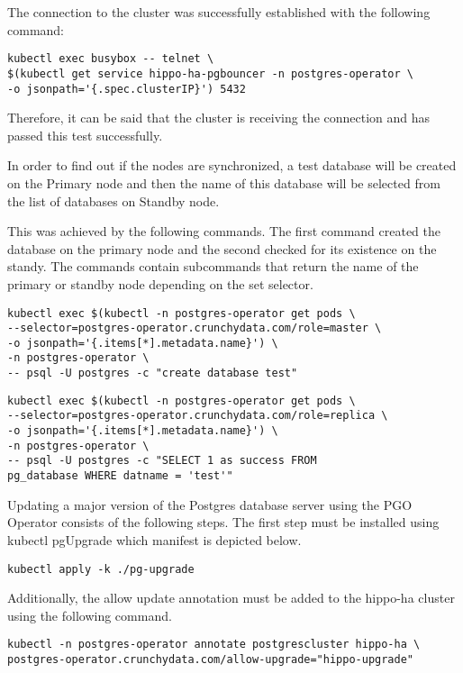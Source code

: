 The connection to the cluster was successfully established with the following command:

\begin{verbatim}
kubectl exec busybox -- telnet \
$(kubectl get service hippo-ha-pgbouncer -n postgres-operator \
-o jsonpath='{.spec.clusterIP}') 5432
\end{verbatim}

Therefore, it can be said that the cluster is receiving the connection and has passed this test successfully.

\n{3}{Cluster synchronization}
\label{chap:pgosync}
In order to find out if the nodes are synchronized, a test database will be created on the Primary node and then the name of this database will be selected from the list of databases on Standby node.

This was achieved by the following commands. The first command created the database on the primary node and the second checked for its existence on the standy. The commands contain subcommands that return the name of the primary or standby node depending on the set selector.

\begin{verbatim}
kubectl exec $(kubectl -n postgres-operator get pods \
--selector=postgres-operator.crunchydata.com/role=master \
-o jsonpath='{.items[*].metadata.name}') \
-n postgres-operator \
-- psql -U postgres -c "create database test"
\end{verbatim}
\begin{verbatim}
kubectl exec $(kubectl -n postgres-operator get pods \
--selector=postgres-operator.crunchydata.com/role=replica \
-o jsonpath='{.items[*].metadata.name}') \
-n postgres-operator \
-- psql -U postgres -c "SELECT 1 as success FROM 
pg_database WHERE datname = 'test'"
\end{verbatim}

Updating a major version of the Postgres database server using the PGO Operator consists of the following steps. The first step must be installed using kubectl pgUpgrade which manifest is depicted below.
\begin{verbatim}
kubectl apply -k ./pg-upgrade
\end{verbatim}

Additionally, the allow update annotation must be added to the hippo-ha cluster using the following command.
\begin{verbatim}
kubectl -n postgres-operator annotate postgrescluster hippo-ha \
postgres-operator.crunchydata.com/allow-upgrade="hippo-upgrade"
\end{verbatim}


